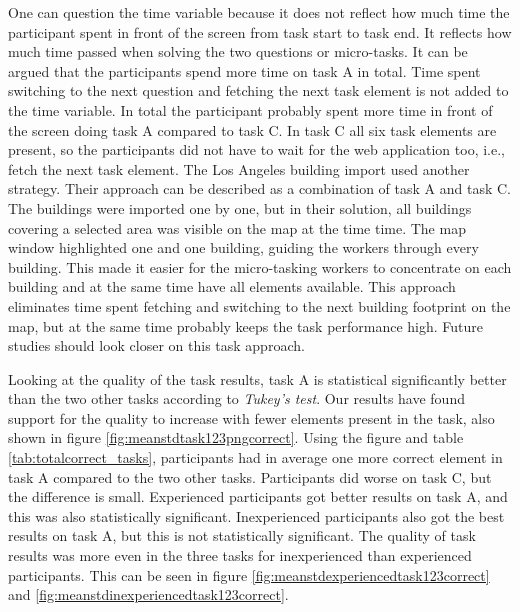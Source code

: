 One can question the time variable because it does not reflect how much time the participant spent in front of the screen from task start to task end. It reflects how much time passed when solving the two questions or micro-tasks. It can be argued that the participants spend more time on task A in total. Time spent switching to the next question and fetching the next task element is not added to the time variable. In total the participant probably spent more time in front of the screen doing task A compared to task C. In task C all six task elements are present, so the participants did not have to wait for the web application too, i.e., fetch the next task element. The Los Angeles building import used another strategy. Their approach can be described as a combination of task A and task C. The buildings were imported one by one, but in their solution, all buildings covering a selected area was visible on the map at the time time. The map window highlighted one and one building, guiding the workers through every building. This made it easier for the micro-tasking workers to concentrate on each building and at the same time have all elements available. This approach eliminates time spent fetching and switching to the next building footprint on the map, but at the same time probably keeps the task performance high. Future studies should look closer on this task approach.

Looking at the quality of the task results, task A is statistical significantly better than the two other tasks according to \textit{Tukey's test}. Our results have found support for the quality to increase with fewer elements present in the task, also shown in figure \ref{fig:meanstdtask123pngcorrect}. Using the figure and table \ref{tab:totalcorrect_tasks}, participants had in average one more correct element in task A compared to the two other tasks. Participants did worse on task C, but the difference is small. Experienced participants got better results on task A, and this was also statistically significant. Inexperienced participants also got the best results on task A, but this is not statistically significant. The quality of task results was more even in the three tasks for inexperienced than experienced participants. This can be seen in figure \ref{fig:meanstdexperiencedtask123correct} and \ref{fig:meanstdinexperiencedtask123correct}. 


